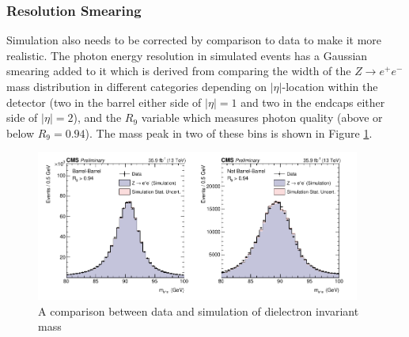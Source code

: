 \subsubsection{Resolution Smearing}
Simulation also needs to be corrected by comparison to data to make it more realistic. The photon energy resolution in simulated events has a Gaussian smearing added to it which is derived from comparing the width of the $Z\rightarrow{}e^{+}e^{-}$ mass distribution in different categories depending on $|\eta|$-location within the detector (two in the barrel either side of $|\eta|=1$ and two in the endcaps either side of $|\eta|=2$), and the $R_{9}$ variable which measures photon quality (above or below $R_{9}=0.94$).
The mass peak in two of these bins is shown in Figure \ref{fig:object_reco:invariant_mass_validation}.
\begin{figure}[h!]
    \includegraphics[width=0.95\textwidth]{figures/object_reco/CMS-PAS-HIG-16-040_Figure_001.pdf}
    \caption{A comparison between data and simulation of dielectron invariant mass}
        \label{fig:object_reco:invariant_mass_validation}
\end{figure}

